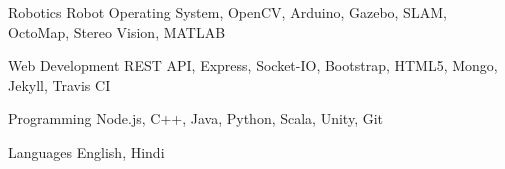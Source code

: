 
\begin{cvskills}

  \cvskill
    {Robotics} %
    {Robot Operating System, OpenCV, Arduino, Gazebo, SLAM, OctoMap, Stereo Vision, MATLAB} %

  \cvskill
    {Web Development} %
    {REST API, Express, Socket-IO, Bootstrap, HTML5, Mongo, Jekyll, Travis CI} %

  \cvskill
    {Programming} %
    {Node.js, C++, Java, Python, Scala, Unity, Git} %

  \cvskill
    {Languages} %
    {English, Hindi} %

\end{cvskills}
